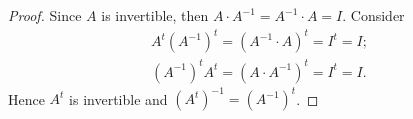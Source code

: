 \begin{Exercise}
	\begin{proof}
		Since $A$ is invertible, then $A\cdot A^{-1} = A^{-1}\cdot A = I$. Consider 
		\begin{align*}
		A^t(A^{-1})^t = (A^{-1}\cdot A)^t = I^t = I; \\
		(A^{-1})^t A^t= (A\cdot A^{-1})^t = I^t = I.
		\end{align*}
		Hence $A^t$ is invertible and $(A^t)^{-1} = (A^{-1})^t$.
	\end{proof}
\end{Exercise}